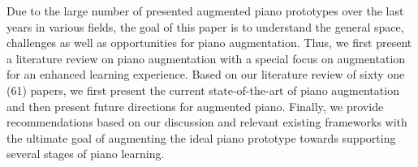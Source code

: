 \documentclass[sigchi, review]{acmart}
\begin{document}
Due to the large number of presented augmented piano prototypes over the last years in various fields, the goal of this paper is to understand the general space, challenges as well as opportunities for piano augmentation. Thus, we first present a literature review on piano augmentation with a special focus on augmentation for an enhanced learning experience. Based on our literature review of sixty one (61) papers, we first present the current state-of-the-art of piano augmentation and then present future directions for augmented piano. Finally, we provide recommendations based on our discussion and relevant existing frameworks with the ultimate goal of augmenting the ideal piano prototype towards supporting several stages of piano learning. 

\end{document}
